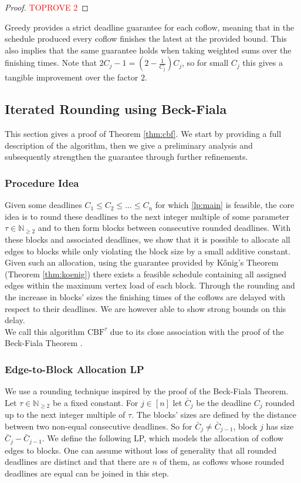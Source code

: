 \documentclass[11pt]{article}
\begin{document}
\rslemmagreedy*

\begin{proof}\textcolor{red}{TOPROVE 2}\end{proof}

$\mathrm{Greedy}$ provides a strict deadline guarantee for each coflow, meaning that in the schedule produced every coflow finishes the latest at the provided bound. This also implies that the same guarantee holds when taking weighted sums over the finishing times. Note that $2C_j - 1 = (2 - \frac{1}{C_j})C_j$, so for small $C_j$ this gives a tangible improvement over the factor $2$.



\subsection{Iterated Rounding using Beck-Fiala} \label{sec:beckfiala}
This section gives a proof of Theorem \ref{thm:cbf}. We start by providing a full description of the algorithm, then we give a preliminary analysis and subsequently strengthen the guarantee through further refinements.
\subsubsection*{Procedure Idea}

Given some deadlines $C_1 \le C_2 \le \dotsc \le C_n$ for which \ref{lp:main} is feasible, the core idea is to round these deadlines to the next integer multiple of some parameter $\tau \in \mathbb{N}_{\ge 2}$ and to then form blocks between consecutive rounded deadlines. With these blocks and associated deadlines, we show that it is possible to allocate all edges to blocks while only violating the block size by a small additive constant. Given such an allocation, using the guarantee provided by Kőnig's Theorem (Theorem \ref{thm:koenig}) there exists a feasible schedule containing all assigned edges within the maximum vertex load of each block. Through the rounding and the increase in blocks' sizes the finishing times of the coflows are delayed with respect to their deadlines. We are however able to show strong bounds on this delay.\\
We call this algorithm $\mathrm{CBF}^\tau$ due to its close association with the proof of the Beck-Fiala Theorem \cite{Beck1981}.

\subsubsection*{Edge-to-Block Allocation LP}
We use a rounding technique inspired by the proof of the Beck-Fiala Theorem. Let $\tau \in \mathbb{N}_{\ge 2}$ be a fixed constant. For $j \in [n]$ let $\bar{C}_j$ be the deadline $C_j$ rounded up to the next integer multiple of $\tau$. The blocks' sizes are defined by the distance between two non-equal consecutive deadlines. So for $\bar{C}_j \neq \bar{C}_{j-1}$, block $j$ has size $\bar{C}_j - \bar{C}_{j-1}$. We define the following LP, which models the allocation of coflow edges to blocks. One can assume without loss of generality that all rounded deadlines are distinct and that there are $n$ of them, as coflows whose rounded deadlines are equal can be joined in this step.
\end{document}
